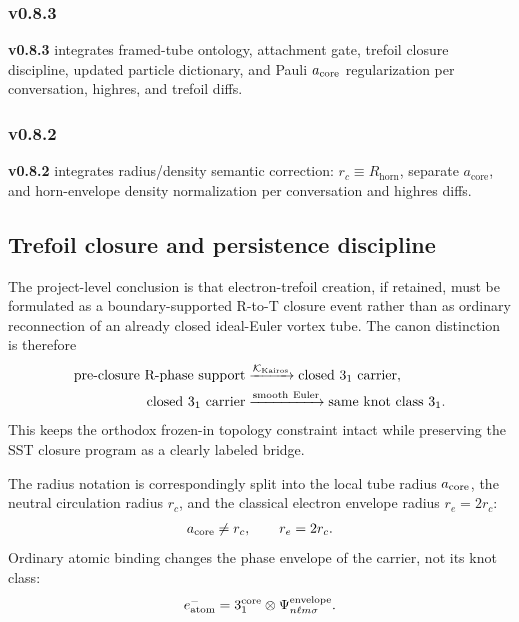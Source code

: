 \documentclass[11pt]{article}
\theoremstyle{definition}
\theoremstyle{plain}
\theoremstyle{remark}
\newcommand{\rc}{{r_c}}
\begin{document}
        \subsubsection{v0.8.3}
            \textbf{v0.8.3} integrates framed-tube ontology, attachment gate, trefoil closure discipline, updated particle dictionary, and Pauli $a_{\rm core}$ regularization per conversation, highres, and trefoil diffs.

        \subsubsection{v0.8.2}
            \textbf{v0.8.2} integrates radius/density semantic correction: $\rc \equiv R_{\mathrm{horn}}$, separate $a_{\mathrm{core}}$, and horn-envelope density normalization per conversation and highres diffs.


        \subsection{Trefoil closure and persistence discipline}
            The project-level conclusion is that electron-trefoil creation, if
            retained, must be formulated as a boundary-supported R-to-T closure
            event rather than as ordinary reconnection of an already closed
            ideal-Euler vortex tube. The canon distinction is therefore
            \begin{align}
                \text{pre-closure R-phase support}
                &\xrightarrow{\mathcal{K}_{\rm Kairos}}
                \text{closed }3_1\text{ carrier},\\
                \text{closed }3_1\text{ carrier}
                &\xrightarrow{\rm smooth\ Euler}
                \text{same knot class }3_1 .
            \end{align}
            This keeps the orthodox frozen-in topology constraint intact while
            preserving the SST closure program as a clearly labeled bridge.

            The radius notation is correspondingly split into the local tube
            radius \(a_{\rm core}\), the neutral circulation radius \(\rc\), and
            the classical electron envelope radius \(r_e=2\rc\):
            \begin{align}
                a_{\rm core} \neq \rc,
                \qquad
                r_e=2\rc .
            \end{align}
            Ordinary atomic binding changes the phase envelope of the carrier,
            not its knot class:
            \begin{align}
                e^-_{\rm atom}
                =
                3_1^{\rm core}\otimes\Psi_{n\ell m\sigma}^{\rm envelope} .
            \end{align}
\end{document}

